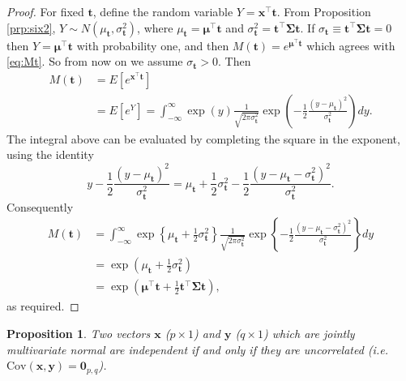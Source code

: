 \documentclass[]{book}
\newtheorem{proposition}{Proposition}[chapter]
\theoremstyle{definition}
\theoremstyle{definition}
\theoremstyle{definition}
\theoremstyle{remark}
\begin{document}
\begin{proof}
{}For fixed \(\mathbf t\), define the random variable \(Y=\boldsymbol x^\top {\mathbf t}\). From Proposition \ref{prp:six2}, \(Y \sim N(\mu_{\mathbf t}, \sigma_{\mathbf t}^2)\), where \(\mu_{\mathbf t}=\boldsymbol \mu^\top {\mathbf t}\) and \(\sigma_{\mathbf t}^2={\mathbf t}^\top \boldsymbol \Sigma{\mathbf t}\). If \(\sigma_{\mathbf t}\equiv {\mathbf t}^\top \boldsymbol \Sigma{\mathbf t}=0\) then \(Y=\boldsymbol \mu^\top {\mathbf t}\) with probability one, and then \(M({\mathbf t})=e^{\boldsymbol \mu^\top {\mathbf t}}\) which agrees with \eqref{eq:Mt}. So from now on we assume \(\sigma_{\mathbf t}>0\). Then
\begin{align*}
M({\mathbf t})&=E[e^{\boldsymbol x^\top {\mathbf t}}]\\
&=E[e^{Y}]=\int_{-\infty}^\infty \exp(y) \frac{1}{\sqrt{2\pi \sigma_{\mathbf t}^2}}
\exp\left (-\frac{1}{2}\frac{(y-\mu_{\mathbf t})^2}{\sigma_{\mathbf t}^2} \right )dy.
\end{align*}
The integral above can be evaluated by completing the square in the exponent, using the identity
\[
y-\frac{1}{2}\frac{(y-\mu_{\mathbf t})^2}{\sigma_{\mathbf t}^2}=\mu_{\mathbf t}
+\frac{1}{2}\sigma_{\mathbf t}^2-\frac{1}{2}\frac{(y-\mu_{\mathbf t}-\sigma_{\mathbf t}^2)^2}{\sigma_{\mathbf t}^2}.
\]
Consequently
\begin{align*}
M({\mathbf t})&=\int_{-\infty}^\infty \exp \left \{\mu_{\mathbf t} +\frac{1}{2}\sigma_{\mathbf t}^2 \right \}
\frac{1}{\sqrt{2 \pi \sigma_{\mathbf t}^2}}\exp \left \{ -\frac{1}{2} \frac{(y-\mu_{\mathbf t}-\sigma_{\mathbf t}^2)^2}
{\sigma_{\mathbf t}^2}\right \}dy\\
&=\exp\left ( \mu_{\mathbf t} + \frac{1}{2}\sigma_{\mathbf t}^2  \right )\\
&=\exp\left (
\boldsymbol \mu^\top {\mathbf t} + \frac{1}{2}{\mathbf t}^\top \boldsymbol \Sigma{\mathbf t}\right ),
\end{align*}
as required.
\end{proof}

\begin{proposition}
\protect\hypertarget{prp:six4}{}{\label{prp:six4} }Two vectors \(\boldsymbol x\) (\(p \times 1\)) and \(\boldsymbol y\) (\(q \times 1\)) which are jointly multivariate normal are independent if and only if they are uncorrelated (i.e. \(\text{Cov}(\boldsymbol x,\boldsymbol y) = \boldsymbol 0_{p,q}\)).
\end{proposition}
\end{document}
